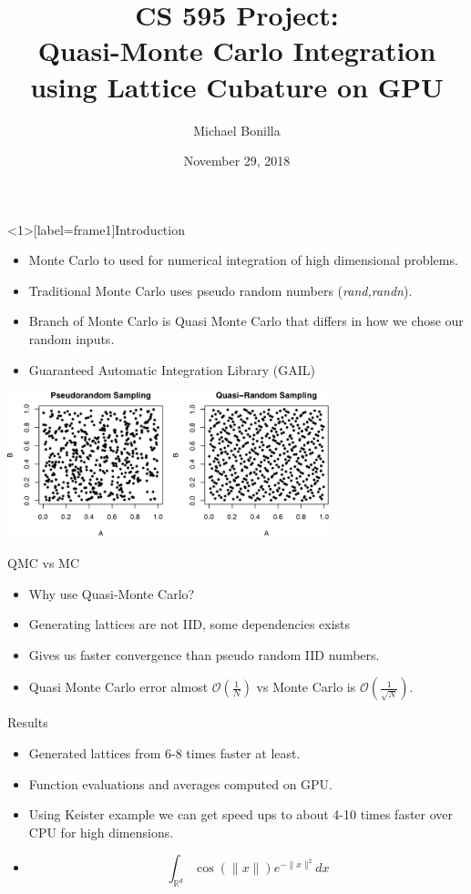 \documentclass[11pt]{beamer}
\author{Michael Bonilla}
\title{CS 595 Project: \\ Quasi-Monte Carlo Integration using
Lattice Cubature on GPU}
\date{November 29, 2018}
\begin{document}
\nocite{*}
\begin{frame}
\titlepage
\end{frame}


\begin{frame}<1>[label=frame1]{Introduction}
\begin{itemize}
\item Monte Carlo to used for numerical integration of high dimensional problems.
\item Traditional Monte Carlo uses pseudo random numbers (\textit{rand,randn}).
\item Branch of Monte Carlo is Quasi Monte Carlo that differs in how we chose our random inputs.
\item Guaranteed Automatic Integration Library (GAIL)
\end{itemize}
\end{frame}

\begin{frame}
\centering
\includegraphics[width=0.7\textwidth]{pvsq.png} 
\end{frame}

\begin{frame}{QMC vs MC}
\begin{itemize}
\item Why use Quasi-Monte Carlo?
\item Generating lattices are not IID, some dependencies exists
\item Gives us faster convergence than pseudo random IID numbers.
\item Quasi Monte Carlo error almost $\mathcal{O}(\frac{1}{N})$ vs Monte Carlo is $\mathcal{O}(\frac{1}{\sqrt{N}})$.
\end{itemize}
\end{frame}

\begin{frame}{Results}%
\begin{itemize}
\item Generated lattices from 6-8 times faster at least.
\item Function evaluations and averages computed on GPU.
\item Using Keister example we can get speed ups to about 4-10 times faster over CPU for high dimensions.
\item \[ \int_{\mathbb{R}^d}\cos(\|x\|)e^{-\|x\|^2} \textit{d}x\]
\end{itemize}
\end{frame}
\end{document}
